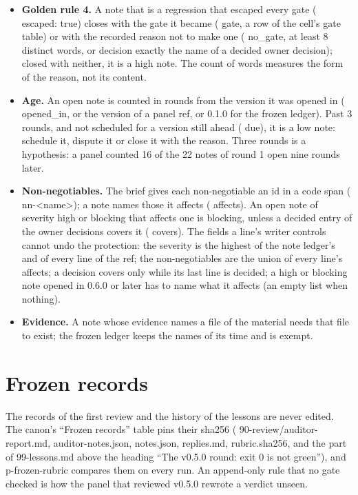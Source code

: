 \documentclass[
  american,
  10pt,
]{report}
\providecommand{\tightlist}{%
  \setlength{\itemsep}{0pt}\setlength{\parskip}{0pt}}
\renewcommand{\texttt}[1]{{\ttfamily\hyphenchar\font=-1 #1}}
\begin{document}
\begin{itemize}
\tightlist
\item
  \textbf{Golden rule 4.} A note that is a regression that escaped every
  gate (\texttt{escaped:\allowbreak{} true}) closes with the gate it
  became (\texttt{gate}, a row of the cell's gate table) or with the
  recorded reason not to make one (\texttt{no\_\allowbreak{}gate}, at
  least 8 distinct words, or \texttt{decision} exactly the name of a
  decided owner decision); closed with neither, it is a high note. The
  count of words measures the form of the reason, not its content.
\item
  \textbf{Age.} An open note is counted in rounds from the version it
  was opened in (\texttt{opened\_\allowbreak{}in}, or the version of a
  panel ref, or 0.1.0 for the frozen ledger). Past 3 rounds, and not
  scheduled for a version still ahead (\texttt{due}), it is a low note:
  schedule it, dispute it or close it with the reason. Three rounds is a
  hypothesis: a panel counted 16 of the 22 notes of round 1 open nine
  rounds later.
\item
  \textbf{Non-negotiables.} The brief gives each non-negotiable an id in
  a code span (\texttt{nn-\allowbreak{}<name>}); a note names those it
  affects (\texttt{affects}). An open note of severity high or blocking
  that affects one is blocking, unless a decided entry of the owner
  decisions covers it (\texttt{covers}). The fields a line's writer
  controls cannot undo the protection: the severity is the highest of
  the note ledger's and of every line of the ref; the non-negotiables
  are the union of every line's \texttt{affects}; a decision covers only
  while its last line is \texttt{decided}; a high or blocking note
  opened in 0.6.0 or later has to name what it affects (an empty list
  when nothing).
\item
  \textbf{Evidence.} A note whose evidence names a file of the material
  needs that file to exist; the frozen ledger keeps the names of its
  time and is exempt.
\end{itemize}

\section{Frozen records}\label{frozen-records}

The records of the first review and the history of the lessons are never
edited. The canon's ``Frozen records'' table pins their sha256
(\texttt{90-\allowbreak{}review/\allowbreak{}auditor-\allowbreak{}report.\allowbreak{}md},
\texttt{auditor-\allowbreak{}notes.\allowbreak{}json},
\texttt{notes.\allowbreak{}json}, \texttt{replies.\allowbreak{}md},
\texttt{rubric.\allowbreak{}sha256}, and the part of
\texttt{99-\allowbreak{}lessons.\allowbreak{}md} above the heading ``The
v0.5.0 round: exit 0 is not green''), and
\texttt{p-\allowbreak{}frozen-\allowbreak{}rubric} compares them on
every run. An append-only rule that no gate checked is how the panel
that reviewed v0.5.0 rewrote a verdict unseen.
\end{document}
